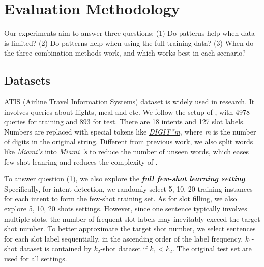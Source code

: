 \section{Evaluation Methodology}
Our experiments aim to answer three questions: (1) Do \RE patterns help when data is limited? (2) Do \RE patterns help when using the full training data? (3) When do the three combination methods work, and which works best in each scenario?

\subsection{Datasets}
\label{sec_datasest} ATIS (Airline Travel Information Systems) dataset \cite{hemphill1990atis} is widely used in \NLU research. It involves
queries about flights, meal and etc. We follow the setup of \cite{liu2016attention}, with 4978 queries for training and 893 for test. There
are 18 intents and 127 slot labels. Numbers are replaced with special tokens like \textsl{\underline{DIGIT*m}}, where \emph{m} is the
number of digits in the original string. Different from previous work, we also split words like \textsl{\underline{Miami's}} into
\textsl{\underline{Miami 's}}  to reduce the
number of unseen words, which eases few-shot leanring and reduces the complexity of \RE.

To answer question (1), we also explore the \textbf{\emph{full few-shot learning setting}}. Specifically, for intent detection, we randomly
select 5, 10, 20 training instances for each intent to form the few-shot training set. As for slot filling, we also explore 5, 10, 20 shots
settings. However, since one sentence typically involves multiple slots, the number of frequent slot labels may inevitably exceed the
target shot number. To better approximate the target shot number, we select sentences for each slot label sequentially, in the ascending
order of the label frequency.
$k_1$-shot dataset is contained by $k_2$-shot dataset if $k_1 < k_2$.
The original test set are used for all settings.

